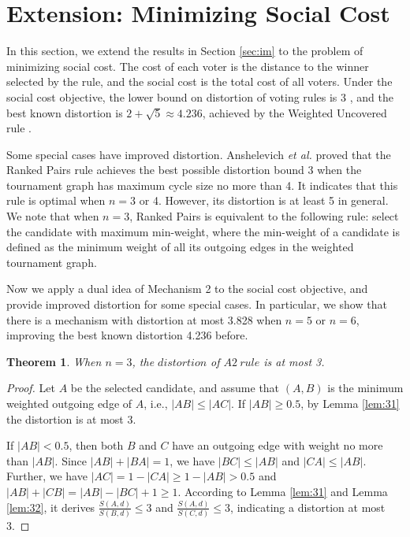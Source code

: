 \documentclass[11pt]{article}
\newtheorem{theorem}{Theorem}[section]
\theoremstyle{remark}
\begin{document}




\section{Extension: Minimizing Social Cost}\label{sec:min}

In this section, we extend the results in Section \ref{sec:im} to the problem of minimizing social cost. The cost of each voter is the distance to the winner selected by the rule, and the social cost is the total cost of all voters. Under the social cost objective, the lower bound on distortion of voting rules is 3 \cite{anshelevich2015approximating}, and the best known distortion is $2+\sqrt5\approx 4.236$, achieved by the Weighted Uncovered rule \cite{munagala2019improved}.

Some special cases have improved distortion. Anshelevich \emph{et al.} \cite{anshelevich2015approximating}  proved that the Ranked Pairs rule achieves the best possible distortion bound 3 when the tournament graph  has  maximum cycle size no more than 4. It indicates that this rule is optimal when $n=3$ or 4. However, its distortion is at least 5 in general. We note that when $n=3$, Ranked Pairs is equivalent to the following rule: select the candidate with maximum min-weight, where the min-weight of a candidate is defined as the minimum weight of all its outgoing edges in the weighted tournament graph. %

Now we apply a dual idea of Mechanism 2 to the social cost objective, and provide improved distortion for some special cases. In particular, we show that there is a mechanism with distortion at most 3.828 when $n=5$ or $n=6$, improving the best known distortion 4.236 before.


\iffalse
\begin{theorem}\label{thm:A2}
 When $n=3$, the $distortion$ of $A2\ rule$ is at most 3.
 \end{theorem}

\begin{proof}
 Let $A$ be the selected candidate, and assume that $(A,B)$ is the minimum weighted outgoing edge of $A$, i.e., $|AB|\le |AC|$. If $|AB|\ge 0.5$, by Lemma \ref{lem:31} the distortion is at most 3.

 If $|AB|<0.5$, then both $B$ and $C$ have an outgoing edge with weight no more than $|AB|$.  Since $|AB|+|BA|=1$, we have $|BC|\le |AB|$ and $|CA|\le |AB|$.
Further, we have $|AC|=1-|CA|\ge 1-|AB| > 0.5$ and $|AB|+|CB| = |AB|-|BC|+1\ge 1$. According to Lemma \ref{lem:31} and Lemma \ref{lem:32}, it derives $\frac{S(A,d)}{S(B,d)}\le 3$ and $\frac{S(A,d)}{S(C,d)}\le 3$, indicating a distortion at most 3.
\end{proof}
\end{document}
